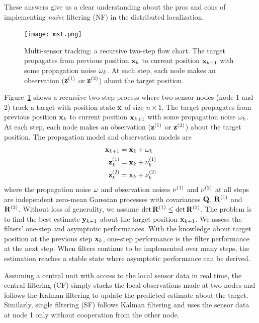 These answers give us a clear understanding about the pros and cons of implementing \textit{na\"ive} filtering (NF) in the distributed localization.

\begin{figure}[htbp]
\centering
\texttt{[image: mst.png]}
\caption{Multi-sensor tracking: a recursive two-step flow chart. The target propagates from previous position ${\bf x}_k$ to current position ${\bf x}_{k+1}$ with some propagation noise ${\bf \omega}_k$. At each step, each node makes an observation (${\bf z}^{(1)}$ or ${\bf z}^{(2)}$) about the target position.}
\label{fig:mst}
\end{figure}

Figure~\ref{fig:mst} shows a recursive two-step process where two sensor nodes (node 1 and 2) track a target with position state $\bf x$ of size $n\times 1$. The target propagates from previous position ${\bf x}_k$ to current position ${\bf x}_{k+1}$ with some propagation noise ${\bf \omega}_k$. At each step, each node makes an observation (${\bf z}^{(1)}$ or ${\bf z}^{(2)}$) about the target position. The propagation model and observation models are
\begin{equation}
\begin{split}
{\bf x}_{k+1}&={\bf x}_k+{\bf \omega}_k\\
{\bf z}^{(1)}_k&={\bf x}_k+{\bf \nu}^{(1)}_k \\
{\bf z}^{(2)}_k&={\bf x}_k+{\bf \nu}^{(2)}_k\\
\end{split}
\end{equation}
where the propagation noise $\bf \omega$ and observation noises ${\bf \nu}^{(1)}$ and ${\bf \nu}^{(2)}$ at all steps are independent zero-mean Gaussian processes with covariances ${\bf Q}$, ${\bf R}^{(1)}$ and ${\bf R}^{(2)}$. Without loss of generality, we assume $\det{\bf R}^{(1)}\leq\det{\bf R}^{(2)}$. The problem is to find the best estimate ${\bf y}_{k+1}$ about the target position ${\bf x}_{k+1}$. We assess the filters' one-step and asymptotic performances. With the knowledge about target position at the previous step ${\bf x}_{k}$, one-step performance is the filter performance at the next step. When filters continue to be implemented over many steps, the estimation reaches a stable state where asymptotic performance can be derived.

Assuming a central unit with access to the local sensor data in real time, the central filtering (CF) simply stacks the local observations made at two nodes and follows the Kalman filtering to update the predicted estimate about the target. Similarly, single filtering (SF) follows Kalman filtering and uses the sensor data at node 1 only without cooperation from the other node.

